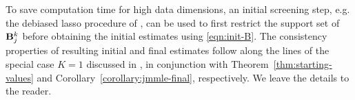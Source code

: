 \begin{Remark}
To save computation time for high data dimensions, an initial screening step, e.g. the debiased lasso procedure of \citet{JavanmardMontanari14}, can be used to first restrict the support set of ${\mathbf{B}}_j^k$ before obtaining the initial estimates using \eqref{eqn:init-B}. The consistency properties of resulting initial and final estimates follow along the lines of the special case $K=1$ discussed in \citet{LinEtal16}, in conjunction with Theorem~\ref{thm:starting-values} and Corollary~\ref{corollary:jmmle-final}, respectively. We leave the details to the reader.
\end{Remark}